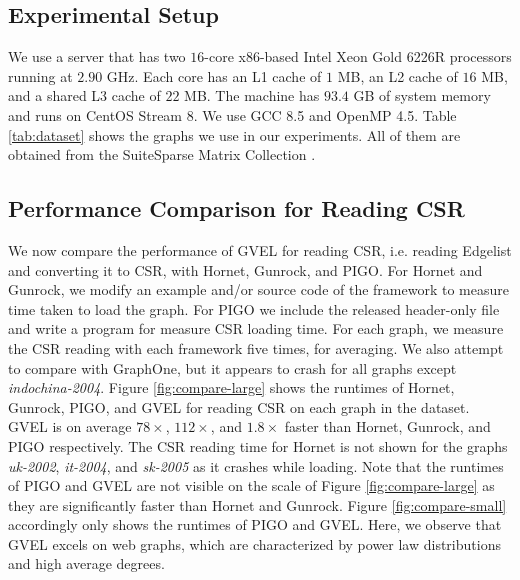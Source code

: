 \subsection{Experimental Setup}
\label{sec:setup}

We use a server that has two $16$-core x86-based Intel Xeon Gold 6226R processors running at $2.90$ GHz. Each core has an L1 cache of $1$ MB, an L2 cache of $16$ MB, and a shared L3 cache of $22$ MB. The machine has $93.4$ GB of system memory and runs on CentOS Stream 8. We use GCC 8.5 and OpenMP 4.5. Table \ref{tab:dataset} shows the graphs we use in our experiments. All of them are obtained from the SuiteSparse Matrix Collection \cite{kolodziej2019suitesparse}.










\subsection{Performance Comparison for Reading CSR}

We now compare the performance of GVEL for reading CSR, i.e. reading Edgelist and converting it to CSR, with Hornet, Gunrock, and PIGO. For Hornet and Gunrock, we modify an example and/or source code of the framework to measure time taken to load the graph. For PIGO we include the released header-only file and write a program for measure CSR loading time. For each graph, we measure the CSR reading with each framework five times, for averaging. We also attempt to compare with GraphOne, but it appears to crash for all graphs except \textit{indochina-2004}. Figure \ref{fig:compare-large} shows the runtimes of Hornet, Gunrock, PIGO, and GVEL for reading CSR on each graph in the dataset. GVEL is on average $78\times$, $112\times$, and $1.8\times$ faster than Hornet, Gunrock, and PIGO respectively. The CSR reading time for Hornet is not shown for the graphs \textit{uk-2002}, \textit{it-2004}, and \textit{sk-2005} as it crashes while loading. Note that the runtimes of PIGO and GVEL are not visible on the scale of Figure \ref{fig:compare-large} as they are significantly faster than Hornet and Gunrock. Figure \ref{fig:compare-small} accordingly only shows the runtimes of PIGO and GVEL. Here, we observe that GVEL excels on web graphs, which are characterized by power law distributions and high average degrees.

